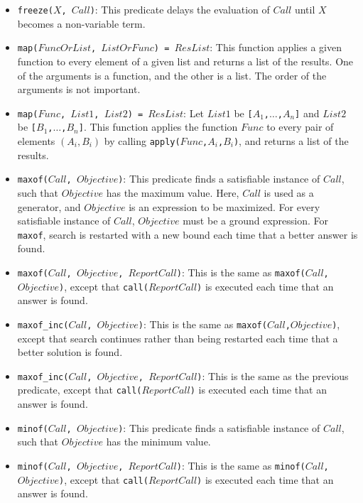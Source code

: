 \begin{itemize}
\item \texttt{freeze($X$, $Call$)}: This predicate delays the evaluation of $Call$ until $X$ becomes a non-variable term.
\item \texttt{map($FuncOrList$, $ListOrFunc$) = $ResList$}: This function applies a given function to every element of a given list and returns a list of the results. One of the arguments is a function, and the other is a list. The order of the arguments is not important. 
\item \texttt{map($Func$, $List1$, $List2$) = $ResList$}: Let $List1$ be \texttt{[$A_1$,$\ldots$,$A_n$]} and $List2$ be \texttt{[$B_1$,$\ldots$,$B_n$]}. This function applies the function $Func$ to every pair of elements $(A_i,B_i)$ by calling \texttt{apply($Func$,$A_i$,$B_i$)}, and returns a list of the results.
\item \texttt{maxof($Call$, $Objective$)}: This predicate finds a satisfiable instance of $Call$, such that $Objective$ has the maximum value. Here, $Call$ is used as a generator, and $Objective$ is an expression to be maximized. For every satisfiable instance of $Call$, $Objective$ must be a ground expression. For \texttt{maxof}, search is restarted with a new bound each time that a better answer is found.
\item \texttt{maxof($Call$, $Objective$, $ReportCall$)}: This is the same as \texttt{maxof($Call$,$Objective$)}, except that \texttt{call($ReportCall$)} is executed each time that an answer is found.
\item \texttt{maxof\_inc($Call$, $Objective$)}: This is the same as \texttt{maxof($Call$,$Objective$)}, except that search continues rather than being restarted each time that a better solution is found.
\item \texttt{maxof\_inc($Call$, $Objective$, $ReportCall$)}: This is the same as the previous predicate, except that \texttt{call($ReportCall$)} is executed each time that an answer is found.
\item \texttt{minof($Call$, $Objective$)}: This predicate finds a satisfiable instance of $Call$, such that $Objective$ has the minimum value. 
\item \texttt{minof($Call$, $Objective$, $ReportCall$)}: This is the same as \texttt{minof($Call$,$Objective$)}, except that \texttt{call($ReportCall$)} is executed each time that an answer is found.

\end{itemize}
